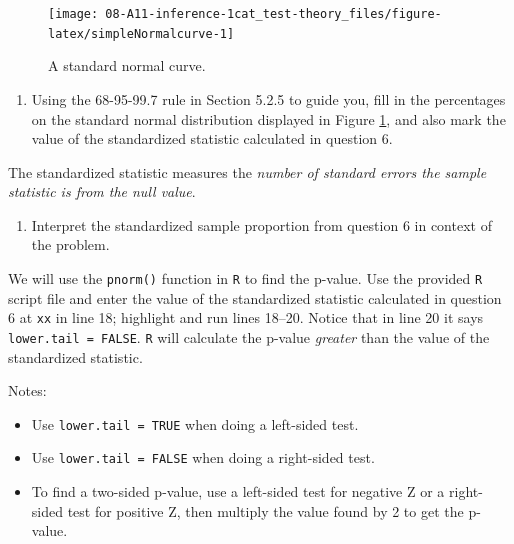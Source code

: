 \documentclass[
]{report}
\providecommand{\tightlist}{%
  \setlength{\itemsep}{0pt}\setlength{\parskip}{0pt}}
\begin{document}
\begin{figure}

{\centering \texttt{[image: 08-A11-inference-1cat\_test-theory\_files/figure-latex/simpleNormalcurve-1]} 

}

\caption{A standard normal curve.}\label{fig:simpleNormalcurve}
\end{figure}

\begin{enumerate}
\def\labelenumi{\arabic{enumi}.}
\setcounter{enumi}{6}
\tightlist
\item
  Using the 68-95-99.7 rule in Section 5.2.5 to guide you, fill in the percentages on the standard normal distribution displayed in Figure \ref{fig:simpleNormalcurve}, and also mark the value of the standardized statistic calculated in question 6.
\end{enumerate}

\vspace{0.2in}

The standardized statistic measures the \emph{number of standard errors the sample statistic is from the null value}.

\begin{enumerate}
\def\labelenumi{\arabic{enumi}.}
\setcounter{enumi}{7}
\tightlist
\item
  Interpret the standardized sample proportion from question 6 in context of the problem.
\end{enumerate}

\vspace{.8in}

We will use the \texttt{pnorm()} function in \texttt{R} to find the p-value. Use the provided \texttt{R} script file and enter the value of the standardized statistic calculated in question 6 at \texttt{xx} in line 18; highlight and run lines 18--20. Notice that in line 20 it says \texttt{lower.tail\ =\ FALSE}. \texttt{R} will calculate the p-value \emph{greater} than the value of the standardized statistic.

Notes:

\begin{itemize}
\tightlist
\item
  Use \texttt{lower.tail\ =\ TRUE} when doing a left-sided test.
\item
  Use \texttt{lower.tail\ =\ FALSE} when doing a right-sided test.
\item
  To find a two-sided p-value, use a left-sided test for negative Z or a right-sided test for positive Z, then multiply the value found by 2 to get the p-value.
\end{itemize}
\end{document}
